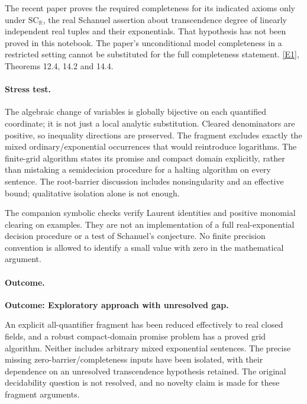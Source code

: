 \documentclass[11pt,a4paper]{article}
\newcommand{\R}{\mathbb{R}}
\newcommand{\eref}[2]{\hyperlink{extra:#1:#2}{[E#2]}}
\numberwithin{equation}{section}
\begin{document}
The recent paper proves the required completeness for its indicated
axioms only under $\mathrm{SC}_{\R}$, the real Schanuel assertion about
transcendence degree of linearly independent real tuples and their
exponentials.  That hypothesis has not been proved in this notebook.
The paper's unconditional model completeness in a restricted setting
cannot be substituted for the full completeness statement.
\eref{statement}{1}, Theorems 12.4, 14.2 and 14.4.

\paragraph{Stress test.}
The algebraic change of variables is globally bijective on each
quantified coordinate; it is not just a local analytic substitution.
Cleared denominators are positive, so inequality directions are
preserved.  The fragment excludes exactly the mixed ordinary/exponential
occurrences that would reintroduce logarithms.  The finite-grid algorithm
states its promise and compact domain explicitly, rather than mistaking
a semidecision procedure for a halting algorithm on every sentence.
The root-barrier discussion includes nonsingularity and an effective
bound; qualitative isolation alone is not enough.

The companion symbolic checks verify Laurent identities and positive
monomial clearing on examples.  They are not an implementation of a
full real-exponential decision procedure or a test of Schanuel's
conjecture.  No finite precision convention is allowed to identify a
small value with zero in the mathematical argument.

\paragraph{Outcome.}
\textbf{Outcome: Exploratory approach with unresolved gap.}

An explicit all-quantifier fragment has been reduced effectively to
real closed fields, and a robust compact-domain promise problem has a
proved grid algorithm.  Neither includes arbitrary mixed exponential
sentences.  The precise missing zero-barrier/completeness inputs have
been isolated, with their dependence on an unresolved transcendence
hypothesis retained.  The original decidability question is not resolved,
and no novelty claim is made for these fragment arguments.
\end{document}
